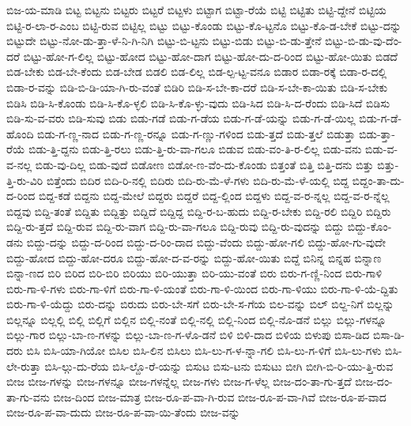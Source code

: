 {ಬಿಜ-ಯ-ಮಾಡಿ
ಬಿಟ್ಟ
ಬಿಟ್ಟನು
ಬಿಟ್ಟರು
ಬಿಟ್ಟರೆ
ಬಿಟ್ಟಳು
ಬಿಟ್ಟಾಗ
ಬಿಟ್ಟಾ-ರೆಯೆ
ಬಿಟ್ಟಿ
ಬಿಟ್ಟಿತು
ಬಿಟ್ಟಿ-ದ್ದೇನೆ
ಬಿಟ್ಟಿಯ
ಬಿಟ್ಟಿ-ರ-ಲಾ-ರ-ಎಂಬ
ಬಿಟ್ಟಿ-ರುವ
ಬಿಟ್ಟಿಲ್ಲ
ಬಿಟ್ಟು
ಬಿಟ್ಟು-ಕೊಂಡು
ಬಿಟ್ಟು-ಕೊ-ಟ್ಟನೊ
ಬಿಟ್ಟು-ಕೊ-ಡ-ಬೇಕೆ
ಬಿಟ್ಟು-ದನ್ನು
ಬಿಟ್ಟುದೇ
ಬಿಟ್ಟು-ನೋ-ಡು-ತ್ತಾ-ಳೆ-ನಿ-ಗಿ-ನಿಗಿ
ಬಿಟ್ಟು-ಬಿ-ಟ್ಟನು
ಬಿಟ್ಟು-ಬಿಡು
ಬಿಟ್ಟು-ಬಿ-ಡು-ತ್ತೇನೆ
ಬಿಟ್ಟು-ಬಿ-ಡು-ವು-ದೆಂ-ದರೆ
ಬಿಟ್ಟು-ಹೋ-ಗ-ಲಿಲ್ಲ
ಬಿಟ್ಟು-ಹೋದ
ಬಿಟ್ಟು-ಹೋ-ದಾಗ
ಬಿಟ್ಟು-ಹೋ-ದು-ದ-ರಿಂದ
ಬಿಟ್ಟು-ಹೋ-ಯಿತು
ಬಿಡದೆ
ಬಿಡ-ಬೇಕು
ಬಿಡ-ಬೇ-ಕೆಂದು
ಬಿಡ-ಬೇಡ
ಬಿಡಲಿ
ಬಿಡ-ಲಿಲ್ಲ
ಬಿಡ-ಲ್ಪ-ಟ್ಟ-ವನೂ
ಬಿಡಾರ
ಬಿಡಾ-ರಕ್ಕೆ
ಬಿಡಾ-ರ-ದಲ್ಲಿ
ಬಿಡಾ-ರ-ವನ್ನು
ಬಿಡಿ-ಬಿ-ಡಿ-ಯಾ-ಗಿ-ರು-ವಂತೆ
ಬಿಡಿರಿ
ಬಿಡಿ-ಸ-ಬೇ-ಕಾ-ದರೆ
ಬಿಡಿ-ಸ-ಬೇ-ಕಾ-ಯಿತು
ಬಿಡಿ-ಸ-ಬೇಕು
ಬಿಡಿಸಿ
ಬಿಡಿ-ಸಿ-ಕೊಂಡು
ಬಿಡಿ-ಸಿ-ಕೊ-ಳ್ಳಲಿ
ಬಿಡಿ-ಸಿ-ಕೊ-ಳ್ಳು-ವುದು
ಬಿಡಿ-ಸಿದ
ಬಿಡಿ-ಸಿ-ದ-ರೆಂದು
ಬಿಡಿ-ಸಿದೆ
ಬಿಡಿಸು
ಬಿಡಿ-ಸು-ವ-ವರು
ಬಿಡಿ-ಸುವು
ಬಿಡು
ಬಿಡು-ಗಡೆ
ಬಿಡು-ಗ-ಡೆಯ
ಬಿಡು-ಗ-ಡೆ-ಯನ್ನು
ಬಿಡು-ಗ-ಡೆ-ಯಿಲ್ಲ
ಬಿಡು-ಗ-ಡೆ-ಹೊಂದಿ
ಬಿಡು-ಗ-ಣ್ಣ-ನಾದ
ಬಿಡು-ಗ-ಣ್ಣ-ರನ್ನೂ
ಬಿಡು-ಗ-ಣ್ಣು-ಗಳಿಂದ
ಬಿಡು-ತ್ತದೆ
ಬಿಡು-ತ್ತಲೆ
ಬಿಡುತ್ತಾ
ಬಿಡು-ತ್ತಾ-ರೆಯೆ
ಬಿಡು-ತ್ತಿ-ದ್ದನು
ಬಿಡು-ತ್ತಿ-ರಲು
ಬಿಡು-ತ್ತಿ-ರು-ವಾ-ಗಲೂ
ಬಿಡುವ
ಬಿಡು-ವಂ-ತಿ-ರ-ಲಿಲ್ಲ
ಬಿಡು-ವನು
ಬಿಡು-ವ-ವ-ನಲ್ಲ
ಬಿಡು-ವು-ದಿಲ್ಲ
ಬಿಡು-ವುದೆ
ಬಿಡೋಣ
ಬಿಡೋ-ಣ-ವೆಂ-ದು-ಕೊಂಡು
ಬಿತ್ತಂತೆ
ಬಿತ್ತಿ
ಬಿತ್ತಿ-ದನು
ಬಿತ್ತು
ಬಿತ್ತು-ತ್ತಿ-ರು-ವಿರಿ
ಬಿತ್ತೆಂದು
ಬಿದಿರ
ಬಿದಿ-ರಿ-ನಲ್ಲಿ
ಬಿದಿರು
ಬಿದಿ-ರು-ಮೆ-ಳೆ-ಗಳು
ಬಿದಿ-ರು-ಮೆ-ಳೆ-ಯಲ್ಲಿ
ಬಿದ್ದ
ಬಿದ್ದಂ-ತಾ-ದು-ದ-ರಿಂದ
ಬಿದ್ದ-ಕಡೆ
ಬಿದ್ದನು
ಬಿದ್ದ-ಮೇಲೆ
ಬಿದ್ದರು
ಬಿದ್ದರೆ
ಬಿದ್ದ-ಲ್ಲಿಂದ
ಬಿದ್ದಳು
ಬಿದ್ದ-ವ-ರ-ನ್ನಲ್ಲ
ಬಿದ್ದ-ವ-ರ-ನ್ನೆಲ್ಲ
ಬಿದ್ದವು
ಬಿದ್ದಿ-ತಂತೆ
ಬಿದ್ದಿತು
ಬಿದ್ದಿತ್ತು
ಬಿದ್ದಿದೆ
ಬಿದ್ದಿದ್ದ
ಬಿದ್ದಿ-ರ-ಬ-ಹುದು
ಬಿದ್ದಿ-ರ-ಬೇಕು
ಬಿದ್ದಿ-ರಲಿ
ಬಿದ್ದಿರಿ
ಬಿದ್ದಿರು
ಬಿದ್ದಿ-ರು-ತ್ತದೆ
ಬಿದ್ದಿ-ರುವ
ಬಿದ್ದಿ-ರು-ವಾಗ
ಬಿದ್ದಿ-ರು-ವಾ-ಗಲೂ
ಬಿದ್ದಿ-ರುವು
ಬಿದ್ದಿ-ರು-ವುದನ್ನು
ಬಿದ್ದು
ಬಿದ್ದು-ಕೊಂ-ಡನು
ಬಿದ್ದು-ದನ್ನು
ಬಿದ್ದು-ದ-ರಿಂದ
ಬಿದ್ದು-ದ-ರಿಂ-ದಾದ
ಬಿದ್ದು-ವೆಂದು
ಬಿದ್ದು-ಹೋ-ಗಲಿ
ಬಿದ್ದು-ಹೋ-ಗು-ವುದೇ
ಬಿದ್ದು-ಹೋದ
ಬಿದ್ದು-ಹೋ-ದರೂ
ಬಿದ್ದು-ಹೋ-ದ-ವ-ರನ್ನು
ಬಿದ್ದು-ಹೋ-ಯಿತು
ಬಿದ್ದೆ
ಬಿನಿನ್ನ
ಬಿನ್ನಹ
ಬಿನ್ನಾಣ
ಬಿನ್ನಾ-ಣದ
ಬಿರಿ
ಬಿರಿದ
ಬಿರಿ-ಬಿರಿ
ಬಿರಿಯು
ಬಿರಿ-ಯುತ್ತಾ
ಬಿರಿ-ಯು-ವಂತೆ
ಬಿರು
ಬಿರು-ಗ-ಣ್ಣಿ-ನಿಂದ
ಬಿರು-ಗಾಳಿ
ಬಿರು-ಗಾ-ಳಿ-ಗಳು
ಬಿರು-ಗಾ-ಳಿಗೆ
ಬಿರು-ಗಾ-ಳಿ-ಯಂತೆ
ಬಿರು-ಗಾ-ಳಿ-ಯಿಂದ
ಬಿರು-ಗಾ-ಳಿಯು
ಬಿರು-ಗಾ-ಳಿ-ಯೆ-ದ್ದಿತು
ಬಿರು-ಗಾ-ಳಿ-ಯೆದ್ದು
ಬಿರು-ದನ್ನು
ಬಿರುದು
ಬಿರು-ಬೇ-ಸಗೆ
ಬಿರು-ಬೇ-ಸ-ಗೆಯ
ಬಿಲ-ವನ್ನು
ಬಿಲ್
ಬಿಲ್ದ-ನಿಗೆ
ಬಿಲ್ಲನ್ನು
ಬಿಲ್ಲನ್ನೂ
ಬಿಲ್ಲಲ್ಲಿ
ಬಿಲ್ಲಿ
ಬಿಲ್ಲಿಗೆ
ಬಿಲ್ಲಿನ
ಬಿಲ್ಲಿ-ನಂತೆ
ಬಿಲ್ಲಿ-ನಲ್ಲಿ
ಬಿಲ್ಲಿ-ನಿಂದ
ಬಿಲ್ಲಿ-ನೊ-ಡನೆ
ಬಿಲ್ಲು
ಬಿಲ್ಲು-ಗಳನ್ನೂ
ಬಿಲ್ಲು-ಗಾರ
ಬಿಲ್ಲು-ಬಾ-ಣ-ಗಳನ್ನು
ಬಿಲ್ಲು-ಬಾ-ಣ-ಗ-ಳೊ-ಡನೆ
ಬಿಳಿ
ಬಿಳಿ-ದಾದ
ಬಿಳಿಯ
ಬಿಳುಪು
ಬಿಸಾ-ಡಿದ
ಬಿಸಾ-ಡಿ-ದರು
ಬಿಸಿ
ಬಿಸಿ-ಯಾ-ಗಿಯೋ
ಬಿಸಿಲ
ಬಿಸಿ-ಲಿನ
ಬಿಸಿಲು
ಬಿಸಿ-ಲು-ಗ-ಳ-ನ್ನಾ-ಗಲಿ
ಬಿಸಿ-ಲು-ಗ-ಳಿಗೆ
ಬಿಸಿ-ಲು-ಗಳು
ಬಿಸಿ-ಲೇ-ರುತ್ತಾ
ಬಿಸಿ-ಲ್ಗು-ದು-ರೆಯ
ಬಿಸಿ-ಲ್ದೊ-ರೆ-ಯನ್ನು
ಬಿಸುಟ
ಬಿಸು-ಟನು
ಬಿಸುಟು
ಬೀಗಿ
ಬೀಗಿ-ಬಿ-ರಿ-ಯು-ತ್ತಿ-ರುವ
ಬೀಜ
ಬೀಜ-ಗಳನ್ನು
ಬೀಜ-ಗಳನ್ನೂ
ಬೀಜ-ಗಳನ್ನೆಲ್ಲ
ಬೀಜ-ಗಳು
ಬೀಜ-ಗ-ಳೆಲ್ಲ
ಬೀಜ-ದಂ-ತಾ-ಗು-ತ್ತದೆ
ಬೀಜ-ದಂ-ತಾ-ಗು-ವನು
ಬೀಜ-ದಿಂದ
ಬೀಜ-ಮಾತ್ರ
ಬೀಜ-ರೂ-ಪ-ವಾ-ಗಿ-ರುವ
ಬೀಜ-ರೂ-ಪ-ವಾ-ಗಿವೆ
ಬೀಜ-ರೂ-ಪ-ವಾದ
ಬೀಜ-ರೂ-ಪ-ವಾ-ದುದು
ಬೀಜ-ರೂ-ಪ-ವಾ-ಯಿ-ತೆಂದು
ಬೀಜ-ವನ್ನು
}
